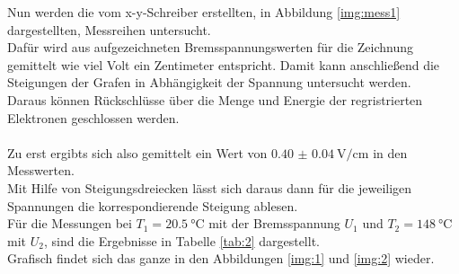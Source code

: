 \noindent
Nun werden die vom x-y-Schreiber erstellten, in Abbildung \ref{img:mess1} dargestellten, Messreihen untersucht.\\
Dafür wird aus aufgezeichneten Bremsspannungswerten für die Zeichnung gemittelt wie viel Volt ein Zentimeter entspricht.
Damit kann anschließend die Steigungen der Grafen in Abhängigkeit der Spannung untersucht werden.\\
Daraus können Rückschlüsse über die Menge und Energie der regristrierten Elektronen geschlossen werden.\\\\
Zu erst ergibts sich also gemittelt ein Wert von $\SI{0.40(4)}{\volt\per\centi\metre}$ in den Messwerten.\\
Mit Hilfe von Steigungsdreiecken lässt sich daraus dann für die jeweiligen Spannungen die korrespondierende Steigung ablesen.\\
Für die Messungen bei $T_1=\SI{20.5}{\celsius}$ mit der Bremsspannung $U_1$ und $T_2=\SI{148}{\celsius}$ mit $U_2$, sind die Ergebnisse in Tabelle \ref{tab:2} dargestellt.\\
Grafisch findet sich das ganze in den Abbildungen \ref{img:1} und \ref{img:2} wieder.


